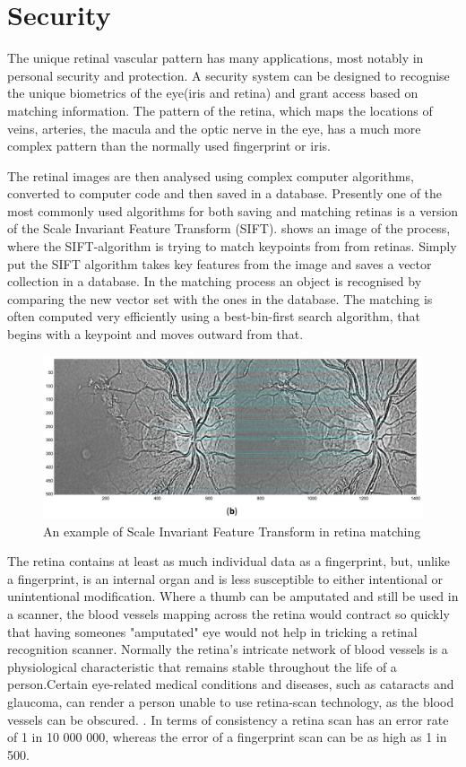 \section{Security}

The unique retinal vascular pattern has many applications, most notably in personal
security and protection. A security system can be designed to recognise the unique
biometrics of the eye(iris and retina) and grant access based on matching information.
The pattern of the retina, which maps the locations of veins, arteries, the macula
and the optic nerve in the eye, has a much more complex pattern than the normally
used fingerprint or iris.\cite{ortega_2009}

The retinal images are then analysed using complex computer algorithms, converted to
computer code and then saved in a database. Presently one of the most commonly used
algorithms for both saving and matching retinas is a version of the Scale Invariant
Feature Transform (SIFT).  shows an image of the process, where the
SIFT-algorithm is trying to match keypoints from from retinas. Simply put the SIFT
algorithm takes key features from the image and saves a vector collection in a database.
In the matching process an object is recognised by comparing the new vector set with
the ones in the database. The matching is often computed very efficiently using a
best-bin-first search algorithm, that begins with a keypoint and moves outward from that.

\begin{figure}[htbp]
\centering
\includegraphics{figures/sift}
\caption{An example of Scale Invariant Feature Transform in retina matching}
\label{fig:sift}
\end{figure}

The retina contains at least as much individual data as a fingerprint, but, unlike
a fingerprint, is an internal organ and is less susceptible to either intentional
or unintentional modification. Where a thumb can be amputated and still be used in
a scanner, the blood vessels mapping across the retina would contract so quickly
that having someones "amputated" eye would not help in tricking a retinal recognition
scanner. Normally the retina’s intricate network of blood vessels is a physiological
characteristic that remains stable throughout the life of a person.Certain eye-related
medical conditions and diseases, such as cataracts and glaucoma, can render a person
unable to use retina-scan technology, as the blood vessels can be obscured.
\cite{rarr_2015}.  In terms of consistency a retina scan has an error rate of
1 in 10 000 000, whereas the error of a fingerprint scan can be as high as 1 in 500.

